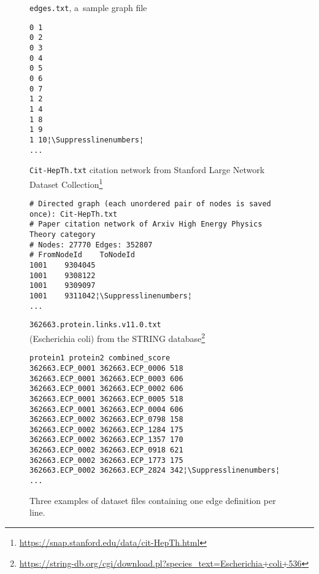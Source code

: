 \begin{savenotes}
\begin{figure}[!ht]
\caption{Three examples of dataset files containing one edge definition per line.}\label{fig:edge_file_examples}
\begin{minipage}[t]{.12\textwidth}
\raggedright\footnotesize \texttt{edges.txt}, a~sample graph file
\begin{lstlisting}
0 1
0 2
0 3
0 4
0 5
0 6
0 7
1 2
1 4
1 8
1 9
1 10¦\Suppresslinenumbers¦
...
\end{lstlisting}\Reactivatelinenumbers
\end{minipage}\hspace*{0.8cm}%
\begin{minipage}[t]{.36\textwidth}
\footnotesize \texttt{Cit-HepTh.txt} citation network from Stan\-ford Large Network Data\-set Col\-lec\-tion\footnote{\url{https://snap.stanford.edu/data/cit-HepTh.html}}
\begin{lstlisting}
# Directed graph (each unordered pair of nodes is saved once): Cit-HepTh.txt
# Paper citation network of Arxiv High Energy Physics Theory category
# Nodes: 27770 Edges: 352807
# FromNodeId	ToNodeId
1001	9304045
1001	9308122
1001	9309097
1001	9311042¦\Suppresslinenumbers¦
...
\end{lstlisting}\Reactivatelinenumbers
\end{minipage}\hspace*{0.8cm}%
\begin{minipage}[t]{0.41\textwidth}
\footnotesize \texttt{362663.protein.links.v11.0.txt} \\(Escherichia coli) from the STRING data\-base\footnote{\url{https://string-db.org/cgi/download.pl?species_text=Escherichia+coli+536}}
\begin{lstlisting}
protein1 protein2 combined_score
362663.ECP_0001 362663.ECP_0006 518
362663.ECP_0001 362663.ECP_0003 606
362663.ECP_0001 362663.ECP_0002 606
362663.ECP_0001 362663.ECP_0005 518
362663.ECP_0001 362663.ECP_0004 606
362663.ECP_0002 362663.ECP_0798 158
362663.ECP_0002 362663.ECP_1284 175
362663.ECP_0002 362663.ECP_1357 170
362663.ECP_0002 362663.ECP_0918 621
362663.ECP_0002 362663.ECP_1773 175
362663.ECP_0002 362663.ECP_2824 342¦\Suppresslinenumbers¦
...
\end{lstlisting}\Reactivatelinenumbers
\end{minipage}%
\hspace*{-0.5cm}
\end{figure}
\end{savenotes}

